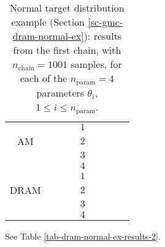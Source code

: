 \begin{table}[h!]
\begin{center}
\begin{tabular}{|c|c|c|c|c|c|c|c|c|}
\hline
\hline
       &          &                        &                        & $1$ &                          &                                &                        &                               \\
\cline{5-9}
AM     &          &                        &                        & $2$ &                          &                                &                        &                               \\
\cline{5-9}
       &          &                        &                        & $3$ &                          &                                &                        &                               \\
\cline{5-9}
       &          &                        &                        & $4$ &                          &                                &                        &                               \\
\hline
\hline
       &          &                        &                        & $1$ &                          &                                &                        &                               \\
\cline{5-9}
DRAM   &          &                        &                        & $2$ &                          &                                &                        &                               \\
\cline{5-9}
       &          &                        &                        & $3$ &                          &                                &                        &                               \\
\cline{5-9}
       &          &                        &                        & $4$ &                          &                                &                        &                               \\
\hline
\end{tabular}
\caption{Normal target distribution example (Section \ref{sc-gmc-dram-normal-ex}):
results from the first chain, with $n_{\text{chain}}=1001$ samples,
for each of the $n_{\text{param}}=4$ parameters $\theta_i$, $1\leqslant i\leqslant n_{\text{param}}$.
}
\label{tab-dram-normal-ex-results-1}
\end{center}
\end{table}

See Table \ref{tab-dram-normal-ex-results-2}.


